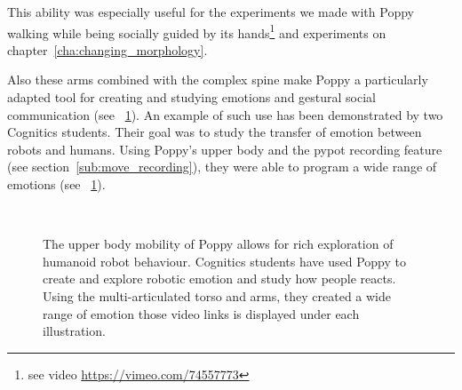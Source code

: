 This ability was especially useful for the experiments we made with Poppy walking while being socially guided by its hands\footnote{see video \url{https://vimeo.com/74557773}} and experiments on chapter~\ref{cha:changing_morphology}.

Also these arms combined with the complex spine make Poppy a particularly adapted tool for creating and studying emotions and gestural social communication (see \figurename~\ref{fig:TER_cognitic}). An example of such use has been demonstrated by two Cognitics students. Their goal was to study the transfer of emotion between robots and humans. Using Poppy's upper body and the pypot recording feature (see section~\ref{sub:move_recording}), they were able to program a wide range of emotions (see \figurename~\ref{fig:TER_cognitic}).


\begin{figure}[tb]
\centering
    \hfil
    \\
    \hfil
    \caption{The upper body mobility of Poppy allows for rich exploration of humanoid robot behaviour. Cognitics students have used Poppy to create and explore robotic emotion and study how people reacts. Using the multi-articulated torso and arms, they created a wide range of emotion those video links is displayed under each illustration. }
    \label{fig:TER_cognitic}
\end{figure}


